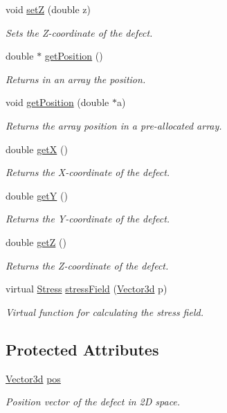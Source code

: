 \begin{DoxyCompactItemize}
void \hyperlink{classDefect_abb0b16c44a1b04d782f5c5f598b49d5b}{set\-Z} (double z)
\begin{DoxyCompactList}\small\item\em \-Sets the \-Z-\/coordinate of the defect. \end{DoxyCompactList}\item 
double $\ast$ \hyperlink{classDefect_a6842fba3ad14032766ccf0437afcbced}{get\-Position} ()
\begin{DoxyCompactList}\small\item\em \-Returns in an array the position. \end{DoxyCompactList}\item 
void \hyperlink{classDefect_aace5c752b85c368631746abc3d5bd714}{get\-Position} (double $\ast$a)
\begin{DoxyCompactList}\small\item\em \-Returns the array position in a pre-\/allocated array. \end{DoxyCompactList}\item 
double \hyperlink{classDefect_a01b96c453c13db82b5835682e1849dc0}{get\-X} ()
\begin{DoxyCompactList}\small\item\em \-Returns the \-X-\/coordinate of the defect. \end{DoxyCompactList}\item 
double \hyperlink{classDefect_a9ea8df3b4c621762a327813056e63911}{get\-Y} ()
\begin{DoxyCompactList}\small\item\em \-Returns the \-Y-\/coordinate of the defect. \end{DoxyCompactList}\item 
double \hyperlink{classDefect_a6f59edeca7ca8bfa01c54fd6b1a62374}{get\-Z} ()
\begin{DoxyCompactList}\small\item\em \-Returns the \-Z-\/coordinate of the defect. \end{DoxyCompactList}\item 
virtual \hyperlink{classStress}{\-Stress} \hyperlink{classDefect_af25282562571e6fe3340e82d02c7ae93}{stress\-Field} (\hyperlink{classVector3d}{\-Vector3d} p)
\begin{DoxyCompactList}\small\item\em \-Virtual function for calculating the stress field. \end{DoxyCompactList}\end{DoxyCompactItemize}
\subsection*{\-Protected \-Attributes}
\begin{DoxyCompactItemize}
\item 
\hyperlink{classVector3d}{\-Vector3d} \hyperlink{classDefect_aed2731c1beefc22e3db6ad5b18194cdd}{pos}
\begin{DoxyCompactList}\small\item\em \-Position vector of the defect in 2\-D space. \end{DoxyCompactList}\end{DoxyCompactItemize}


